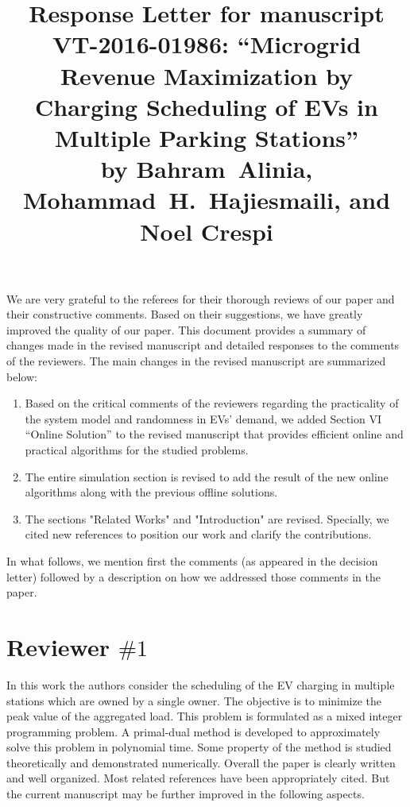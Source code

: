\documentclass[11pt]{article}
\begin{document}
\title{Response Letter for manuscript VT-2016-01986: ``Microgrid Revenue Maximization by Charging Scheduling of EVs in Multiple Parking Stations'' \\
	\vspace{4mm} \large
	by  Bahram~Alinia, Mohammad~H.~Hajiesmaili, and Noel Crespi
}

\maketitle

We are very grateful to the referees for their thorough reviews of our paper and their constructive comments. Based on their suggestions, we have greatly improved the quality of our paper. This document provides a summary of changes made in the revised
manuscript and detailed responses to the comments of the reviewers. The main changes in the revised manuscript are summarized below:

\begin{enumerate}
\item Based on the critical comments of the reviewers regarding the practicality of the system model and randomness in EVs' demand, we added Section VI ``Online Solution'' to the revised manuscript that provides efficient online and practical algorithms for the studied problems. 

\item The entire simulation section is revised to add the result of the new online algorithms along with the previous offline solutions.

\item The sections "Related Works" and "Introduction" are revised. Specially, we cited new references to position our work and clarify the contributions. 

\end{enumerate}


In what follows, we mention first the comments (as appeared in the decision letter) followed by a description on how we addressed those comments in the paper.

\newpage
\section{Reviewer $\# 1$}
{\color{blue}In this work the authors consider the scheduling of the EV charging in multiple stations which are owned by a single owner. The objective is to minimize the peak value of the aggregated load. This problem is formulated as a mixed integer programming problem. A primal-dual method is developed to approximately solve this problem in polynomial time. Some property of the method is studied theoretically and demonstrated numerically. Overall the paper is clearly written and well organized. Most related references have been appropriately cited. But the current manuscript may be further improved in the following aspects.}
\end{document}
